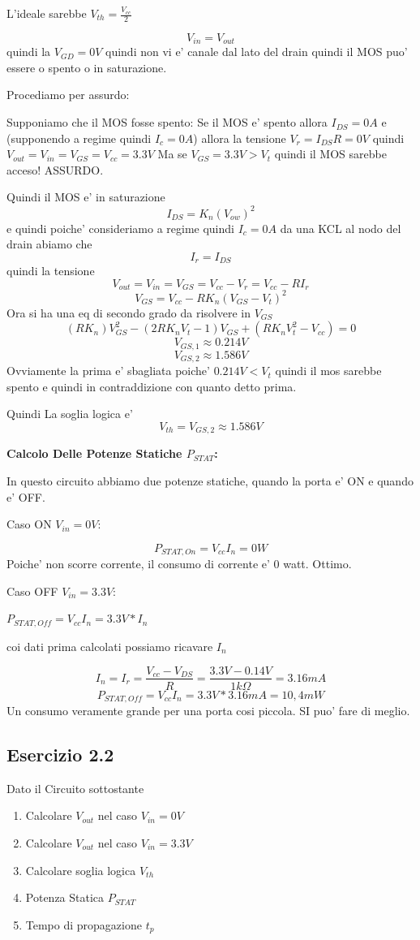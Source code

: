 \documentclass[\main/main.tex]{subfiles}
\begin{document}
L'ideale sarebbe $V_{th} = \frac{V_{cc}}{2}$

\[V_{in} = V_{out}\]
quindi la $V_{GD} = 0V$ quindi non vi e' canale dal lato del drain quindi il MOS puo' essere o spento o in saturazione.

Procediamo per assurdo:

Supponiamo che il MOS fosse spento:
Se il MOS e' spento allora $I_{DS} = 0A$ e (supponendo a regime quindi $I_c = 0A$) allora la tensione $V_r = I_{DS} R = 0V$ quindi $V_{out} = V_{in} = V_{GS} = V_{cc} = 3.3V$
Ma se $V_{GS} = 3.3V > V_t$ quindi il MOS sarebbe acceso!
ASSURDO.

Quindi il MOS e' in saturazione
\[I_{DS} = K_n \left(V_{ow}\right)^2 \]
e quindi poiche' consideriamo a regime quindi $I_c = 0A$
da una KCL al nodo del drain abiamo che
\[I_r = I_{DS} \]
quindi la tensione
\[V_{out} = V_{in} = V_{GS} = V_{cc} - V_r = V_{cc} - R I_r\]
\[V_{GS} = V_{cc} - R K_n \left(V_{GS} - V_t \right)^2\]
Ora si ha una eq di secondo grado da risolvere in $V_{GS}$
\[(R K_n)V_{GS}^2 - (2 R K_n V_t - 1)V_{GS} + (R K_n V_t^2 - V_{cc}) = 0\]
\[V_{GS,1} \approx 0.214V\]
\[V_{GS,2} \approx 1.586V\]
Ovviamente la prima e' sbagliata poiche' $0.214V < V_t$ quindi il mos sarebbe spento e quindi in contraddizione con quanto detto prima.

Quindi La soglia logica e' \[V_{th} = V_{GS,2} \approx 1.586V\]

\textbf{Calcolo Delle Potenze Statiche $P_{STAT}$:}

In questo circuito abbiamo due potenze statiche, quando la porta e' ON e quando e' OFF.

Caso ON $V_{in} = 0V$:

\[P_{STAT,On} = V_{cc} I_{n} = 0W\]
Poiche' non scorre corrente, il consumo di corrente e' 0 watt. Ottimo.


Caso OFF $V_{in} = 3.3V$:

$P_{STAT,Off} = V_{cc} I_{n} = 3.3V * I_{n}$

coi dati prima calcolati possiamo ricavare $I_{n}$

\[I_{n} = I_{r} = \frac{V_{cc} - V_{DS}}{R} = \frac{3.3V - 0.14V}{1k\Omega} = 3.16mA\]
\[P_{STAT,Off} = V_{cc} I_{n} = 3.3V * 3.16mA = 10,4mW\]
Un consumo veramente grande per una porta cosi piccola. SI puo' fare di meglio.

\clearpage
\subsection{Esercizio 2.2}
Dato il Circuito sottostante
\begin{enumerate}
    \item  Calcolare $V_{out}$ nel caso $V_{in} = 0V$
    \item  Calcolare $V_{out}$ nel caso $V_{in} = 3.3V$
    \item  Calcolare soglia logica $V_{th}$
    \item  Potenza Statica $P_{STAT}$
    \item  Tempo di propagazione $t_p$
\end{enumerate}
\end{document}
